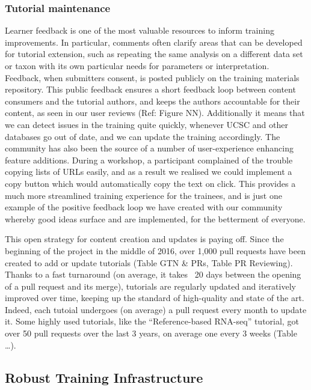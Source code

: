 \documentclass[10pt,letterpaper]{article}
\begin{document}
\subsubsection*{Tutorial maintenance}
Learner feedback is one of the most valuable resources to inform training improvements.
In particular, comments often clarify areas that can be developed for tutorial extension, such as repeating the same analysis on a different data set or taxon with its own particular needs for parameters or interpretation.
Feedback, when submitters consent, is posted publicly on the training materials repository.
This public feedback ensures a short feedback loop between content consumers and the tutorial authors, and keeps the authors accountable for their content, as seen in our user reviews (Ref: Figure NN).
Additionally it means that we can detect issues in the training quite quickly, whenever UCSC and other databases go out of date, and we can update the training accordingly.
The community has also been the source of a number of user-experience enhancing feature additions.
During a workshop, a participant complained of the trouble copying lists of URLs easily, and as a result we realised we could implement a copy button which would automatically copy the text on click.
This provides a much more streamlined training experience for the trainees, and is just one example of the positive feedback loop we have created with our community whereby good ideas surface and are implemented, for the betterment of everyone.


This open strategy for content creation and updates is paying off.
Since the beginning of the project in the middle of 2016, over 1,000 pull requests have been created to add or update tutorials (Table GTN \& PRs, Table PR Reviewing).
Thanks to a fast turnaround (on average, it takes ~20 days between the opening of a pull request and its merge), tutorials are regularly updated and iteratively improved over time, keeping up the standard of high-quality and state of the art.
Indeed, each tutoial undergoes (on average) a pull request every month to update it. Some highly used tutorials, like the “Reference-based RNA-seq” tutorial, got over 50 pull requests over the last 3 years, on average one every 3 weeks (Table …).



\subsection*{Robust Training Infrastructure}
\end{document}
